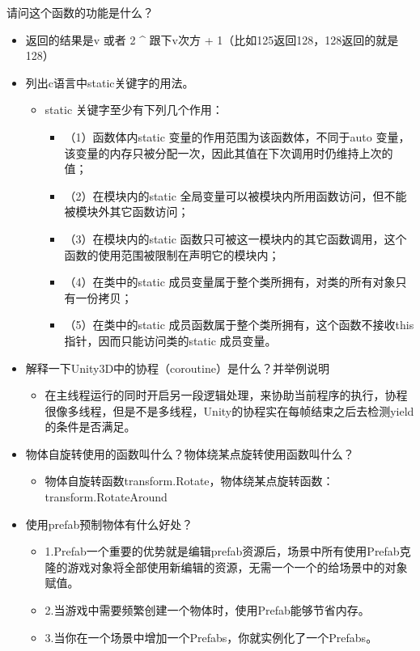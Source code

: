 \documentclass[9pt, b5paper]{article}
\begin{document}
请问这个函数的功能是什么？
\begin{itemize}
\item 返回的结果是v 或者 2 \^{} 跟下v次方 + 1（比如125返回128，128返回的就是128）
\end{itemize}
\begin{itemize}
\item 列出c语言中static关键字的用法。
\begin{itemize}
\item static 关键字至少有下列几个作用：
\begin{itemize}
\item （1）函数体内static 变量的作用范围为该函数体，不同于auto 变量，该变量的内存只被分配一次，因此其值在下次调用时仍维持上次的值；
\item （2）在模块内的static 全局变量可以被模块内所用函数访问，但不能被模块外其它函数访问；
\item （3）在模块内的static 函数只可被这一模块内的其它函数调用，这个函数的使用范围被限制在声明它的模块内；
\item （4）在类中的static 成员变量属于整个类所拥有，对类的所有对象只有一份拷贝；
\item （5）在类中的static 成员函数属于整个类所拥有，这个函数不接收this 指针，因而只能访问类的static 成员变量。
\end{itemize}
\end{itemize}
\item 解释一下Unity3D中的协程（coroutine）是什么？并举例说明
\begin{itemize}
\item 在主线程运行的同时开启另一段逻辑处理，来协助当前程序的执行，协程很像多线程，但是不是多线程，Unity的协程实在每帧结束之后去检测yield的条件是否满足。
\end{itemize}
\item 物体自旋转使用的函数叫什么？物体绕某点旋转使用函数叫什么？
\begin{itemize}
\item 物体自旋转函数transform.Rotate，物体绕某点旋转函数：transform.RotateAround
\end{itemize}
\item 使用prefab预制物体有什么好处？
\begin{itemize}
\item 1.Prefab一个重要的优势就是编辑prefab资源后，场景中所有使用Prefab克隆的游戏对象将全部使用新编辑的资源，无需一个一个的给场景中的对象赋值。
\item 2.当游戏中需要频繁创建一个物体时，使用Prefab能够节省内存。
\item 3.当你在一个场景中增加一个Prefabs，你就实例化了一个Prefabs。

\end{itemize}
\end{itemize}
\end{document}
